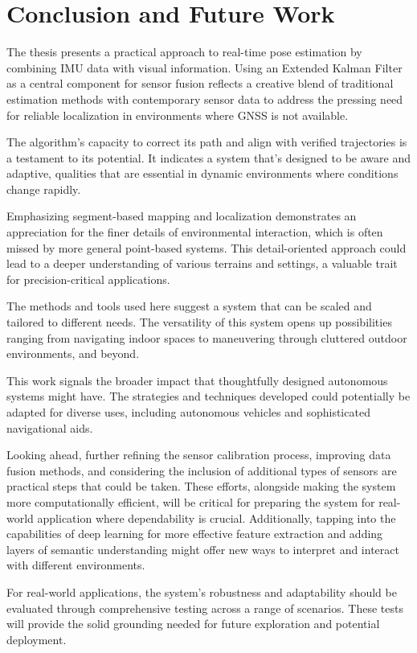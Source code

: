 \chapter{Conclusion and Future Work}
The thesis presents a practical approach to real-time pose estimation by combining IMU data with visual information. Using an Extended Kalman Filter as a central component for sensor fusion reflects a creative blend of traditional estimation methods with contemporary sensor data to address the pressing need for reliable localization in environments where GNSS is not available.

The algorithm's capacity to correct its path and align with verified trajectories is a testament to its potential. It indicates a system that's designed to be aware and adaptive, qualities that are essential in dynamic environments where conditions change rapidly.

Emphasizing segment-based mapping and localization demonstrates an appreciation for the finer details of environmental interaction, which is often missed by more general point-based systems. This detail-oriented approach could lead to a deeper understanding of various terrains and settings, a valuable trait for precision-critical applications.

The methods and tools used here suggest a system that can be scaled and tailored to different needs. The versatility of this system opens up possibilities ranging from navigating indoor spaces to maneuvering through cluttered outdoor environments, and beyond.

This work signals the broader impact that thoughtfully designed autonomous systems might have. The strategies and techniques developed could potentially be adapted for diverse uses, including autonomous vehicles and sophisticated navigational aids.

Looking ahead, further refining the sensor calibration process, improving data fusion methods, and considering the inclusion of additional types of sensors are practical steps that could be taken. These efforts, alongside making the system more computationally efficient, will be critical for preparing the system for real-world application where dependability is crucial. Additionally, tapping into the capabilities of deep learning for more effective feature extraction and adding layers of semantic understanding might offer new ways to interpret and interact with different environments.

For real-world applications, the system's robustness and adaptability should be evaluated through comprehensive testing across a range of scenarios. These tests will provide the solid grounding needed for future exploration and potential deployment.

